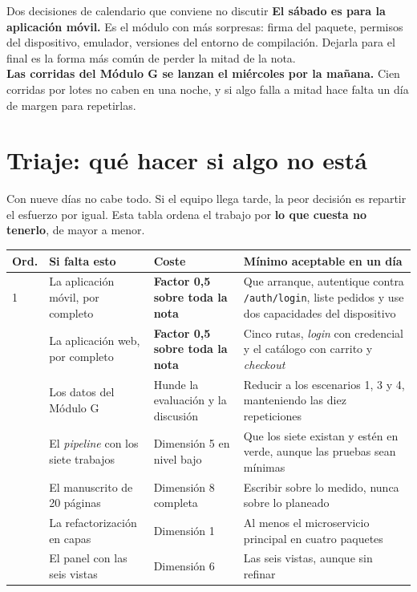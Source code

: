 \documentclass[11pt,a4paper]{article}
\begin{document}
\begin{avisoBox}{Dos decisiones de calendario que conviene no discutir}
	\textbf{El sábado es para la aplicación móvil.} Es el módulo con más sorpresas: firma del paquete, permisos del dispositivo, emulador, versiones del entorno de compilación. Dejarla para el final es la forma más común de perder la mitad de la nota.\\[5pt]
	\textbf{Las corridas del Módulo G se lanzan el miércoles por la mañana.} Cien corridas por lotes no caben en una noche, y si algo falla a mitad hace falta un día de margen para repetirlas.
\end{avisoBox}

\section{Triaje: qué hacer si algo no está}

Con nueve días no cabe todo. Si el equipo llega tarde, la peor decisión es repartir el esfuerzo por igual. Esta tabla ordena el trabajo por \textbf{lo que cuesta no tenerlo}, de mayor a menor.

\begin{center}
	\small
	\begin{longtable}{@{}p{0.9cm}p{5.4cm}p{3.0cm}p{5.0cm}@{}}
		\toprule
		\textbf{Ord.} & \textbf{Si falta esto} & \textbf{Coste} & \textbf{Mínimo aceptable en un día} \\
		\midrule
		\endhead
		1 & La aplicación móvil, por completo & \textbf{Factor 0,5 sobre toda la nota} & Que arranque, autentique contra \texttt{/auth/login}, liste pedidos y use dos capacidades del dispositivo \\
		\addlinespace
		2 & La aplicación web, por completo & \textbf{Factor 0,5 sobre toda la nota} & Cinco rutas, \emph{login} con credencial y el catálogo con carrito y \emph{checkout} \\
		\addlinespace
		3 & Los datos del Módulo G & Hunde la evaluación y la discusión & Reducir a los escenarios 1, 3 y 4, manteniendo las diez repeticiones \\
		\addlinespace
		4 & El \emph{pipeline} con los siete trabajos & Dimensión 5 en nivel bajo & Que los siete existan y estén en verde, aunque las pruebas sean mínimas \\
		\addlinespace
		5 & El manuscrito de 20 páginas & Dimensión 8 completa & Escribir sobre lo medido, nunca sobre lo planeado \\
		\addlinespace
		6 & La refactorización en capas & Dimensión 1 & Al menos el microservicio principal en cuatro paquetes \\
		\addlinespace
		7 & El panel con las seis vistas & Dimensión 6 & Las seis vistas, aunque sin refinar \\
		\bottomrule
	\end{longtable}
\end{center}
\end{document}
